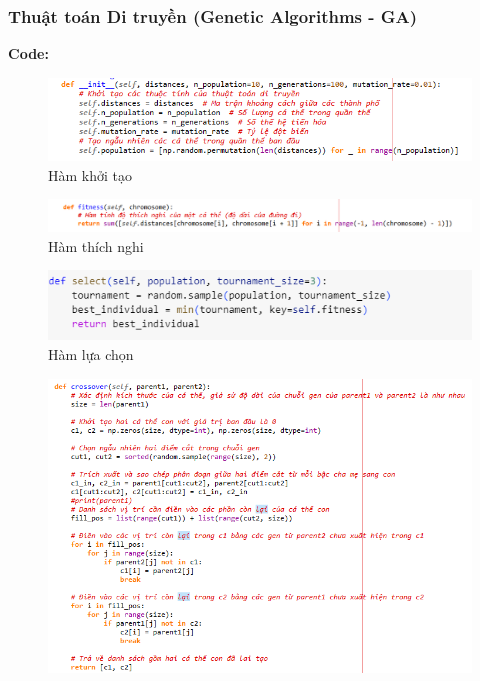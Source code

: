 \documentclass[14pt]{article}
\begin{document}
	\subsubsection{Thuật toán Di truyền (Genetic Algorithms - GA)}
	\textbf{Code:}
	\begin{center}
		\begin{figure}[htbp]
		 		\centering
		 		\includegraphics[width=\textwidth]{./Image/Hàm khởi tạo GA.png}
		 		\caption{Hàm khởi tạo}
		 		\label{fig:mylabel}
		 	\end{figure}
	 	\begin{figure}[htbp]
		 		\centering
		 		\includegraphics[width=\textwidth]{./Image/Hàm thích nghi GA.png}
		 		\caption{Hàm thích nghi}
		 		\label{fig:mylabel}
		 	\end{figure}
	 	\begin{figure}[htbp]
		 		\centering
		 		\includegraphics[width=\textwidth]{./Image/Hàm chọn GA.png}
		 		\caption{Hàm lựa chọn}
		 		\label{fig:mylabel}
		 	\end{figure}
	 	\begin{figure}[htbp]
		 		\centering
		 		\includegraphics[width=\textwidth]{./Image/Hàm lai chéo GA.png}

\end{figure}
\end{center}
\end{document}
